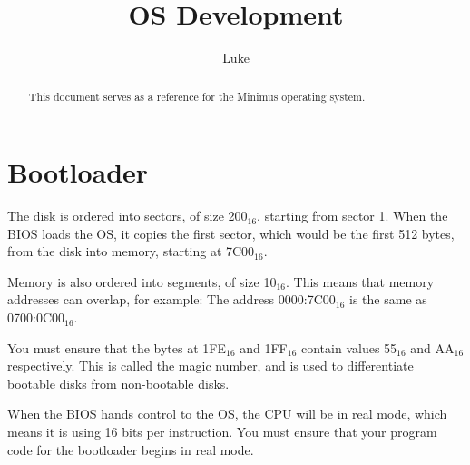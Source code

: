 \documentclass{article}
\title{OS Development}
\author{Luke}
\begin{document}
\maketitle

\begin{abstract}

This document serves as a reference for the Minimus operating system.

\end{abstract}

\newpage

\tableofcontents

\newpage

\section{Bootloader}

The disk is ordered into sectors, of size 200$_{16}$, starting from sector 1.
When the BIOS loads the OS, it copies the first sector,
which would be the first 512 bytes, from the disk into memory,
starting at 7C00$_{16}$.

Memory is also ordered into segments, of size 10$_{16}$. This means that memory
addresses can overlap, for example:
The address 0000:7C00$_{16}$ is the same as 0700:0C00$_{16}$.

You must ensure that the bytes at 1FE$_{16}$ and 1FF$_{16}$
contain values 55$_{16}$ and AA$_{16}$ respectively.
This is called the magic number, and is used to differentiate
bootable disks from non-bootable disks.

When the BIOS hands control to the OS, the CPU will be in real mode,
which means it is using 16 bits per instruction. You must
ensure that your program code for the bootloader begins in real mode.

\newpage

\begin{thebibliography}{99}
\end{thebibliography}
\end{document}
